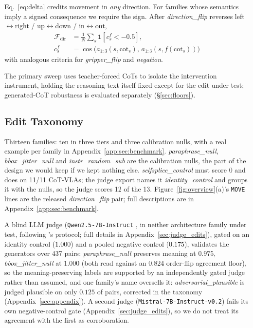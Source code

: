 \documentclass{article}
\begin{document}
Eq.~\ref{eq:delta} credits movement in \emph{any} direction. For families whose semantics imply a signed consequence we require the sign. After \emph{direction\_flip} reverses left$\leftrightarrow$right / up$\leftrightarrow$down / in$\leftrightarrow$out,
\begin{align}
\mathcal{F}_{\text{dir}} &= \tfrac{1}{N}\textstyle\sum_s \mathbf{1}\!\left[c^f_s < -0.5\right], \label{eq:fdir}\\
c^f_s &= \cos\bigl(a_{1:3}(s,\text{cot}_s),\, a_{1:3}(s,f(\text{cot}_s))\bigr) \nonumber
\end{align}
with analogous criteria for \emph{gripper\_flip} and \emph{negation}.

The primary sweep uses teacher-forced CoTs to isolate the intervention instrument, holding the reasoning text itself fixed except for the edit under test; generated-CoT robustness is evaluated separately (\S\ref{sec:floors}).

\subsection{Edit Taxonomy}

Thirteen families: ten in three tiers and three calibration nulls, with a real example per family in Appendix~\ref{app:sec:benchmark}. \emph{paraphrase\_null}, \emph{bbox\_jitter\_null} and \emph{instr\_random\_sub} are the calibration nulls, the part of the design we would keep if we kept nothing else. \emph{selfsplice\_control} must score $0$ and does on 11/11 CoT-VLAs; the judge export names it \emph{identity\_control} and groups it with the nulls, so the judge scores 12 of the 13. Figure~\ref{fig:overview}(a)'s \texttt{MOVE} lines are the released \emph{direction\_flip} pair; full descriptions are in Appendix~\ref{app:sec:benchmark}.

A blind LLM judge (\texttt{Qwen2.5-7B-Instruct} \citep{qwen25}, in neither architecture family under test, following \citet{mtbench}'s protocol; full details in Appendix~\ref{sec:judge_edits}), gated on an identity control ($1.000$) and a pooled negative control ($0.175$), validates the generators over 437 pairs: \emph{paraphrase\_null} preserves meaning at $0.975$, \emph{bbox\_jitter\_null} at $1.000$ (both read against an $0.824$ order-flip agreement floor), so the meaning-preserving labels are supported by an independently gated judge rather than assumed, and one family's name oversells it: \emph{adversarial\_plausible} is judged plausible on only $0.125$ of pairs, corrected in the taxonomy (Appendix~\ref{sec:appendix}). A second judge (\texttt{Mistral-7B-Instruct-v0.2}) fails its own negative-control gate (Appendix~\ref{sec:judge_edits}), so we do not treat its agreement with the first as corroboration.
\end{document}

